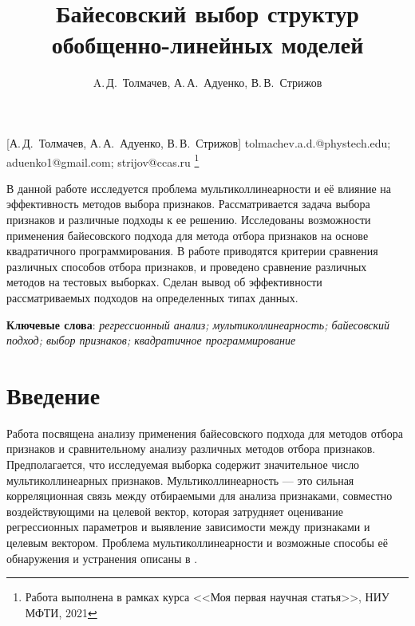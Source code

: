 \documentclass[12pt, twoside]{article}
\begin{document}
\title
    [Байесовский выбор структур обобщенно-линейных моделей] %
    {Байесовский выбор структур обобщенно-линейных моделей}
\author
    [A.\,Д.~Толмачев] %
    {A.\,Д.~Толмачев, А.\,А.~Адуенко, В.\,В.~Стрижов} %
    [А.\,Д.~Толмачев, А.\,А.~Адуенко, В.\,В.~Стрижов] %
\email
    {tolmachev.a.d.@phystech.edu; aduenko1@gmail.com; strijov@ccas.ru}
\thanks
    {Работа выполнена в рамках курса <<Моя первая научная статья>>, НИУ МФТИ, 2021}
    
\abstract
    {В данной работе исследуется проблема мультиколлинеарности и её влияние
    на эффективность методов выбора признаков. Рассматривается задача выбора признаков и различные подходы к ее решению. Исследованы возможности применения байесовского подхода для метода отбора признаков на основе квадратичного программирования. В работе приводятся критерии сравнения различных способов отбора признаков, и проведено сравнение различных методов на тестовых выборках.
    Сделан вывод об эффективности рассматриваемых подходов на определенных типах данных.

\bigskip
\noindent
\textbf{Ключевые слова}: \emph {регрессионный анализ; мультиколлинеарность; байесовский подход; выбор признаков;  квадратичное программирование}
}


\maketitle
\linenumbers

\section{Введение}
Работа посвящена анализу применения байесовского подхода для методов отбора признаков и сравнительному анализу различных методов отбора признаков. Предполагается, что исследуемая выборка содержит значительное число мультиколлинеарных признаков. Мультиколлинеарность — это сильная корреляционная связь между отбираемыми для анализа признаками, совместно
воздействующими на целевой вектор, которая затрудняет оценивание
регрессионных параметров и выявление зависимости между признаками и целевым вектором. Проблема мультиколлинеарности и возможные способы её обнаружения и устранения описаны в \cite{SneeRon, Leamer}. 
\end{document}
